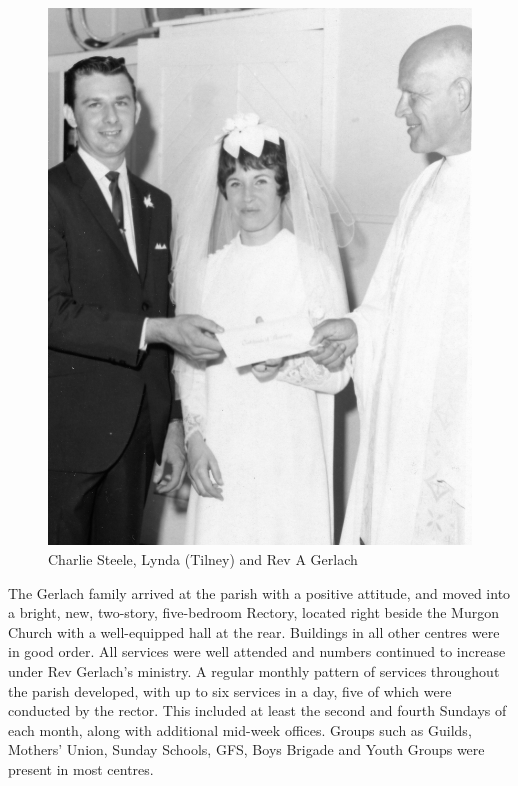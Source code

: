 \begin{figure}
\begin{center}
\includegraphics[width=1.\linewidth,center]{../images/lyndaTilneyVestry.jpg}
\caption{Charlie Steele, Lynda (Tilney) and Rev A Gerlach}
\end{center}
\end{figure}




The Gerlach family arrived at the parish with a positive attitude, and moved into a bright, new, two-story, five-bedroom Rectory, located right beside the Murgon Church with a well-equipped hall at the rear. Buildings in all other centres were in good order. All services were well attended and numbers continued to increase under Rev Gerlach's ministry. A regular monthly pattern of services throughout the parish developed, with up to six services in a day, five of which were conducted by the rector. This included at least the second and fourth Sundays of each month, along with additional mid-week offices. Groups such as Guilds, Mothers' Union, Sunday Schools, GFS, Boys Brigade and Youth Groups were present in most centres.



